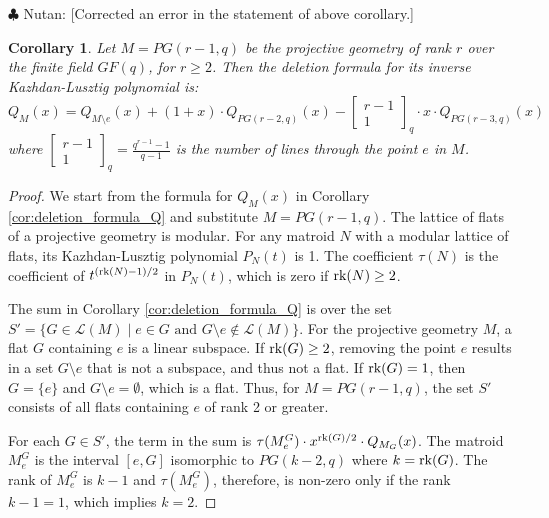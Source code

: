 \documentclass[10pt]{article}
\newcommand{\rank}{\normalfont\text{rk}}
\newcommand{\qbinom}[2]{\begin{bmatrix} #1 \\ #2 \end{bmatrix}_q}
\newtheorem{corollary}[theorem]{Corollary}
\theoremstyle{remark}
\newcommand{\nutan}[1]{{\color{violet} \sf $\clubsuit$ Nutan: [#1]}}
\begin{document}
\nutan{Corrected an error in the statement of above corollary.}

\begin{corollary}
Let $M = PG(r-1, q)$ be the projective geometry of rank $r$ over the finite field $GF(q)$, for $r \geq 2$. Then the deletion formula for its inverse Kazhdan-Lusztig polynomial is:
\[
    Q_M(x) = Q_{M\setminus e}(x) + (1 + x)\cdot Q_{PG(r-2,q)}(x) - \qbinom{r-1}{1} \cdot x \cdot Q_{PG(r-3,q)}(x)
\]
where $\qbinom{r-1}{1} = \frac{q^{r-1}-1}{q-1}$ is the number of lines through the point $e$ in $M$.
\end{corollary}
\begin{proof}
We start from the formula for $Q_M(x)$ in Corollary \ref{cor:deletion_formula_Q} and substitute $M = PG(r-1, q)$.
The lattice of flats of a projective geometry is modular. For any matroid $N$ with a modular lattice of flats,
its Kazhdan-Lusztig polynomial $P_N(t)$ is 1.
The coefficient $\tau(N)$ is the coefficient of $t^{(\rank(N)-1)/2}$ in $P_N(t)$, which is zero if $\rank(N) \geq 2$.

The sum in Corollary \ref{cor:deletion_formula_Q} is over the set
$S' = \{G \in \mathcal{L}(M) \mid e \in G \text{ and } G\setminus e \notin \mathcal{L}(M)\}$.
For the projective geometry $M$, a flat $G$ containing $e$ is a linear subspace. If $\rank(G) \geq 2$, removing the point $e$ results in a set $G\setminus e$ that is not a subspace, and thus not a flat. If $\rank(G)=1$, then $G=\{e\}$ and $G\setminus e = \emptyset$, which is a flat. Thus, for $M=PG(r-1,q)$, the set $S'$ consists of all flats containing $e$ of rank 2 or greater.

For each $G \in S'$, the term in the sum is $\tau(M^G_e)\cdot x^{\rank(G)/2} \cdot Q_{M_G}(x)$.
The matroid $M^G_e$ is the interval $[e, G]$ isomorphic to $PG(k-2,q)$ where $k=\rank(G)$.
The rank of $M^G_e$ is $k-1$ and $\tau(M^G_e)$, therefore, is non-zero only if the rank $k-1=1$, which implies $k=2$.


\end{proof}
\end{document}
